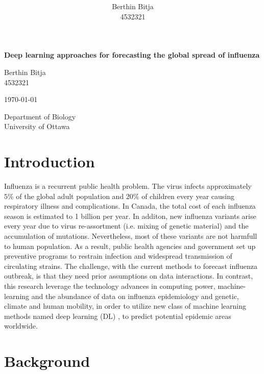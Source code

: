 \documentclass[12pt]{article}
\title{ }
\author{Berthin Bitja \\ 4532321}
\date{}
\begin{document}
\begin{titlepage}
	\centering

	{\Large\bfseries Deep learning approaches for forecasting the global spread of influenza \par}
	\vspace{2cm}
	{\small Berthin Bitja \\ 4532321 \par}
	{\small \today\par}
	\vfill
	
	{\large Department of Biology \\ University of Ottawa \par}


\end{titlepage}

\newpage

\tableofcontents

\newpage

\section{Introduction}
Influenza is a recurrent public health problem. The virus infects approximately $5\%$ of the global adult population and $20\%$ of children every year causing respiratory illness and complications\autocite{Ting2017}. In Canada, the total cost of each influenza season is estimated to 1 billion per year\autocite{Molinari2007}. In additon, new influenza variants arise every year due to virus re-assortment (i.e. mixing of genetic material) and the accumulation of mutations. Nevertheless, most of these variants are not harmfull to human population. As a result, public health agencies and government set up preventive programs  to restrain infection and widespread transmission of circulating strains\autocite{Jefferson2005}. The challenge, with the current methods to forecast  influenza outbreak, is that they need prior assumptions on data interactions. 
In contrast, this research leverage the technology advances in computing power, machine-learning and the abundance of data on influenza epidemiology and genetic, climate and human mobility, in order to utilize new class of machine learning methods named deep learning (DL) , to predict potential epidemic areas worldwide.

\section{Background}
\end{document}
